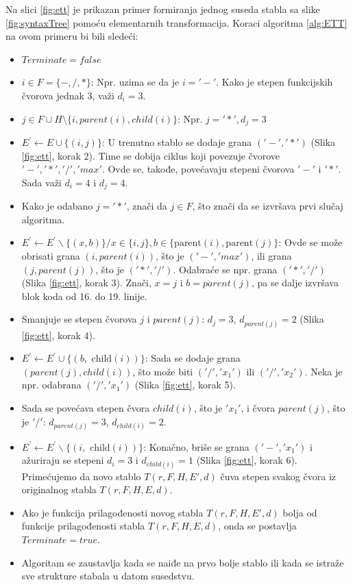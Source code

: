 \documentclass[main.tex]{subfiles}
\begin{document}
Na slici \ref{fig:ett} je prikazan primer formiranja jednog suseda stabla sa slike \ref{fig:syntaxTree} pomoću elementarnih transformacija. Koraci algoritma \autoref{alg:ETT} na ovom primeru bi bili sledeći:
\begin{itemize}
    \item $Terminate = false$
    \item $i \in F = \{-,/,*\}$: Npr. uzima se da je $i = {}'-'$. Kako je stepen funkcijskih čvorova jednak 3, važi $d_i = 3$.
    \item $j \in F \cup H \setminus \{i, parent(i), child(i)\}$: Npr. $j = {}'*', d_j = 3$
    \item $E^{\prime} \leftarrow E \cup\{(i, j)\}$: U trenutno stablo se dodaje grana $({}'-', {}'*')$ (Slika \ref{fig:ett}, korak 2). Time se dobija ciklus koji povezuje čvorove ${}'-', {}'*', {}'/', {}'max'$. Ovde se, takođe, povećavaju stepeni čvorova ${}'-'$ i ${}'*'$. Sada važi $d_i = 4$ i $d_j = 4$.
    \item Kako je odabano $j = {}'*'$, znači da $j \in F$, što znači da se izvršava prvi slučaj algoritma.
    \item $E^{\prime} \leftarrow E^{\prime} \backslash\{(x, b)\} / x \in\{i, j\}, b \in\{\text {parent}(i), \text{parent}(j)\}$: Ovde se može obrisati grana $(i, parent(i))$, što je $({}'-', {}'max')$, ili grana $(j, parent(j))$, što je $({}'*', {}'/')$. Odabraće se npr. grana $({}'*', {}'/')$ (Slika \ref{fig:ett}, korak 3). Znači, $x = j$ i $b = parent(j)$, pa se dalje izvršava blok koda od 16. do 19. linije.
    \item Smanjuje se stepen čvorova $j$ i $parent(j)$: $d_j = 3$, $d_{parent(j)} = 2$ (Slika \ref{fig:ett}, korak 4).
    \item $E^{\prime} \leftarrow E^{\prime} \cup\{(b, \text { child}(i))\}$: Sada se dodaje grana $(parent(j), child(i))$, što može biti $({}'/', {}'x_1')$ ili $({}'/', {}'x_2')$. Neka je npr. odabrana $({}'/', 'x_1')$ (Slika \ref{fig:ett}, korak 5).
    \item Sada se povećava stepen čvora $child(i)$, što je ${}'x_1'$, i čvora $parent(j)$, što je ${}'/'$: $d_{parent(j)} = 3$, $d_{child(i)} = 2$.
    \item $E^{\prime} \leftarrow E^{\prime} \backslash\{(i, \text { child}(i))\}$: Konačno, briše se grana $({}'-', {}'x_1')$ i ažuriraju se stepeni $d_i = 3$ i $d_{child(i)} = 1$ (Slika \ref{fig:ett}, korak 6). Primećujemo da novo stablo $T(r, F, H, E{}', d)$ čuva stepen svakog čvora iz originalnog stabla $T(r, F, H, E, d)$.
    \item Ako je funkcija prilagođenosti novog stabla $T(r, F, H, E{}', d)$ bolja od funkcije prilagođenosti stabla $T(r, F, H, E, d)$, onda se postavlja $Terminate = true$.
    \item Algoritam se zaustavlja kada se naiđe na prvo bolje stablo ili kada se istraže sve strukture stabala u datom susedstvu.
\end{itemize}
\end{document}
